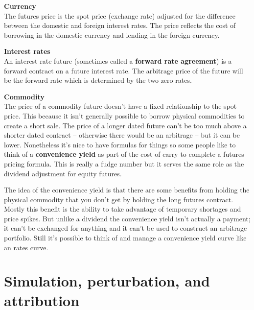 \documentclass{tran-l}
\theoremstyle{definition}
\theoremstyle{remark}
\numberwithin{equation}{subsection}
\begin{document}
\textbf{Currency}\\

The futures price is the spot price (exchange rate) adjusted for the difference between the domestic and foreign interest rates. The price reflects the cost of borrowing in the domestic currency and  lending in the foreign currency.

\textbf{Interest rates}\\

An interest rate future (sometimes called a \textbf{forward rate agreement}) is a forward contract on a future interest rate.  The arbitrage price of the future will be the forward rate which is determined by the two zero rates.

\textbf{Commodity}\\

The price of a commodity future doesn't have a fixed relationship to the spot price. This because it isn't generally possible to borrow physical commodities to create a short sale. The price of a longer dated future can't be too much above a shorter dated contract -- otherwise there would be an arbitrage -- but it can be lower. Nonetheless it's nice to have formulas for things so some people like to think of a \textbf{convenience yield} as part of the cost of carry to complete a futures pricing formula. This is really a fudge number but it serves the same role as the dividend adjustment for equity futures. 

The idea of the convenience yield is that there are some benefits from holding the physical commodity that you don't get by holding the long futures contract. Mostly this benefit is the ability to take advantage of temporary shortages and price spikes. But unlike a dividend the convenience yield isn't actually a payment; it can't be exchanged for anything and it can't be used to construct an arbitrage portfolio. Still it's possible to think of and manage a convenience yield curve like an rates curve. 

\section{Simulation, perturbation, and attribution}

\end{document}
